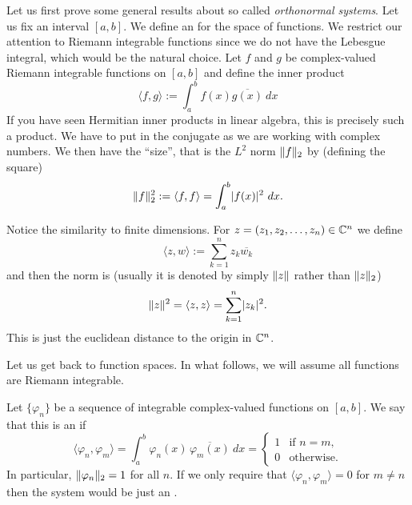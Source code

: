 Let us first prove some general results about so called
\emph{orthonormal systems}.
Let us fix an interval $[a,b]$.  We define an
\emph{} for the space of functions.  We restrict our attention
to Riemann integrable functions since we do not have the Lebesgue
integral, which
would be the natural choice.  Let $f$ and $g$ be complex-valued 
Riemann integrable functions on $[a,b]$ and define the inner product
\begin{equation*}
\langle f , g \rangle :=
\int_a^b f(x) \overline{g(x)} ~ dx
\end{equation*}
If you have seen Hermitian inner products in linear algebra, this
is precisely such a product.  We have to put in the conjugate as we are
working with complex numbers.  We then have the ``size'', that is the
$L^2$ norm $\lVert {f} \rVert_2$ by (defining the square)
\begin{equation*}
\lVert {f} \rVert_2^2 :=
\langle f , f \rangle =
\int_a^b \lvert {f(x)} \rvert^2 ~ dx .
\end{equation*}

\begin{remark}
Notice the similarity to finite dimensions.  For $z = (z_1,z_2,\ldots,z_n) \in 
{\mathbb{C}}^n$ we define 
\begin{equation*}
\langle z , w \rangle :=
\sum_{k=1}^n z_k \overline{w_k}
\end{equation*}
and then the norm is (usually it is denoted by simply $\lVert {z} \rVert$ rather than
$\lVert {z} \rVert_2$)
\begin{equation*}
\lVert {z} \rVert^2 = 
\langle z , z \rangle =
\sum_{k=1}^n \lvert {z_k} \rvert^2 .
\end{equation*}
This is just the euclidean distance to the origin in ${\mathbb{C}}^n$.
\end{remark}

Let us get back to function spaces.  In what follows, we will
assume all functions are Riemann integrable.

\begin{defn}
Let $\{ \varphi_n \}$ be a sequence of integrable complex-valued
functions on $[a,b]$.  We say that this is an
\emph{} if
\begin{equation*}
\langle \varphi_n , \varphi_m \rangle
=
\int_a^b \varphi_n(x) \, \overline{\varphi_m(x)} ~ dx
= 
\begin{cases}
1 & \text{if $n=m$,} \\
0 & \text{otherwise.}
\end{cases}
\end{equation*}
In particular, $\lVert {\varphi_n} \rVert_2 = 1$ for all $n$.  If we
only require that 
$\langle \varphi_n , \varphi_m \rangle = 0$ for $m\not= n$ then
the system would be just an \emph{}.
\end{defn}

